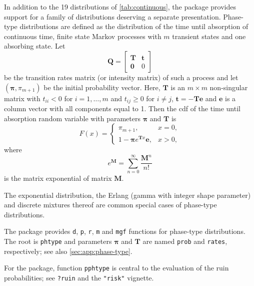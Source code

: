 \documentclass[x11names]{article}
\newcommand{\mat}[1]{\mathbold{#1}} %
\newcommand{\code}[1]{\texttt{#1}}
\begin{document}
In addition to the 19 distributions of \autoref{tab:continuous},
the package provides support for a family of distributions deserving a
separate presentation. Phase-type distributions \citep{Neuts_81} are
defined as the distribution of the time until absorption of continuous
time, finite state Markov processes with $m$ transient states and one
absorbing state. Let
\begin{equation}
  \label{eq:Markov-transition-matrix}
  \mat{Q} =
  \begin{bmatrix}
    \mat{T} & \mat{t} \\
    \mat{0} & 0
  \end{bmatrix}
\end{equation}
be the transition rates matrix (or intensity matrix) of such a process
and let $(\mat{\pi}, \pi_{m + 1})$ be the initial probability vector.
Here, $\mat{T}$ is an $m \times m$ non-singular matrix with $t_{ii} <
0$ for $i = 1, \dots, m$ and $t_{ij} \geq 0$ for $i \neq j$, $\mat{t}
= - \mat{T} \mat{e}$ and $\mat{e}$ is a column vector with all
components equal to 1. Then the cdf of the time until absorption
random variable with parameters $\mat{\pi}$ and $\mat{T}$ is
\begin{equation}
  \label{eq:cdf-phtype}
  F(x) =
  \begin{cases}
    \pi_{m + 1}, & x = 0, \\
    1 - \mat{\pi} e^{\mat{T} x} \mat{e}, & x > 0,
  \end{cases}
\end{equation}
where
\begin{equation}
  \label{eq:matrix-exponential}
  e^{\mat{M}} = \sum_{n = 0}^\infty \frac{\mat{M}^n}{n!}
\end{equation}
is the matrix exponential of matrix $\mat{M}$.

The exponential distribution, the Erlang (gamma with integer shape
parameter) and discrete mixtures thereof are common special cases of
phase-type distributions.

The package provides \code{d}, \code{p}, \code{r}, \code{m} and
\code{mgf} functions for phase-type distributions. The root is
\code{phtype} and parameters $\mat{\pi}$ and $\mat{T}$ are named
\code{prob} and \code{rates}, respectively; see also
\autoref{sec:app:phase-type}.

For the package, function \code{pphtype} is central to the evaluation
of the ruin probabilities; see \code{?ruin} and the \code{"risk"}
vignette.
\end{document}
